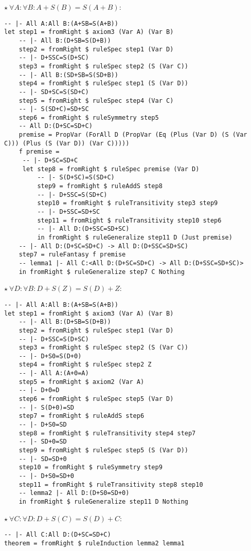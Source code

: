 \documentclass{article}
\begin{document}
\begin{minipage}[t]{0.53\textwidth}
$\star \ \forall A: \forall B: A + S(B) = S(A + B)$:

\begin{lstlisting}
-- |- All A:All B:(A+SB=S(A+B))
let step1 = fromRight $ axiom3 (Var A) (Var B)
    -- |- All B:(D+SB=S(D+B))
    step2 = fromRight $ ruleSpec step1 (Var D)
    -- |- D+SSC=S(D+SC)
    step3 = fromRight $ ruleSpec step2 (S (Var C))
    -- |- All B:(SD+SB=S(SD+B))
    step4 = fromRight $ ruleSpec step1 (S (Var D))
    -- |- SD+SC=S(SD+C)
    step5 = fromRight $ ruleSpec step4 (Var C)
    -- |- S(SD+C)=SD+SC
    step6 = fromRight $ ruleSymmetry step5
    -- All D:(D+SC=SD+C)
    premise = PropVar (ForAll D (PropVar (Eq (Plus (Var D) (S (Var C))) (Plus (S (Var D)) (Var C)))))
    f premise =
     -- |- D+SC=SD+C
     let step8 = fromRight $ ruleSpec premise (Var D)
         -- |- S(D+SC)=S(SD+C)
         step9 = fromRight $ ruleAddS step8
         -- |- D+SSC=S(SD+C)
         step10 = fromRight $ ruleTransitivity step3 step9
         -- |- D+SSC=SD+SC
         step11 = fromRight $ ruleTransitivity step10 step6
         -- |- All D:(D+SSC=SD+SC)
         in fromRight $ ruleGeneralize step11 D (Just premise)
    -- |- All D:(D+SC=SD+C) -> All D:(D+SSC=SD+SC)
    step7 = ruleFantasy f premise
    -- lemma1 |- All C:<All D:(D+SC=SD+C) -> All D:(D+SSC=SD+SC)>
    in fromRight $ ruleGeneralize step7 C Nothing
\end{lstlisting}
\end{minipage}
\begin{minipage}[t]{0.45\textwidth}
$\star \ \forall D: \forall B: D + S(Z) = S(D) + Z$:

\begin{lstlisting}
-- |- All A:All B:(A+SB=S(A+B))
let step1 = fromRight $ axiom3 (Var A) (Var B)
    -- |- All B:(D+SB=S(D+B))
    step2 = fromRight $ ruleSpec step1 (Var D)
    -- |- D+SSC=S(D+SC)
    step3 = fromRight $ ruleSpec step2 (S (Var C))
    -- |- D+S0=S(D+0)
    step4 = fromRight $ ruleSpec step2 Z
    -- |- All A:(A+0=A)
    step5 = fromRight $ axiom2 (Var A)
    -- |- D+0=D
    step6 = fromRight $ ruleSpec step5 (Var D)
    -- |- S(D+0)=SD
    step7 = fromRight $ ruleAddS step6
    -- |- D+S0=SD
    step8 = fromRight $ ruleTransitivity step4 step7
    -- |- SD+0=SD
    step9 = fromRight $ ruleSpec step5 (S (Var D))
    -- |- SD=SD+0
    step10 = fromRight $ ruleSymmetry step9
    -- |- D+S0=SD+0
    step11 = fromRight $ ruleTransitivity step8 step10
    -- lemma2 |- All D:(D+S0=SD+0)
    in fromRight $ ruleGeneralize step11 D Nothing
\end{lstlisting}

$\star \ \forall C: \forall D: D + S(C) = S(D) + C$:

\begin{lstlisting}
-- |- All C:All D:(D+SC=SD+C)
theorem = fromRight $ ruleInduction lemma2 lemma1
\end{lstlisting}
\end{minipage}
\end{document}
